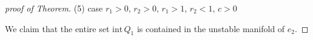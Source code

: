 \documentclass{amsart}
\theoremstyle{definition}
\numberwithin{equation}{section}
\def\ii{{\textrm{int}}\,}
\begin{document}
\begin{proof}[proof of Theorem]
% 
% 
\bigskip\bigskip

(5) case $r_1>0$, $r_2>0$, $r_1 >1$, $r_2<1$, $c>0$

We claim that the entire set $\ii Q_1$ is contained in the unstable manifold of $e_2$. 


\end{proof}
\end{document}
